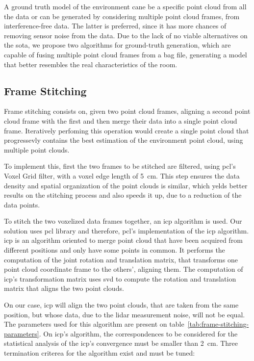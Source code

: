 A ground truth model of the environment cane be a specific point cloud from all the data or can be generated by considering multiple point cloud frames, from interference-free data. The latter is preferred, since it has more chances of removing sensor noise from the data. Due to the lack of no viable alternatives on the \acl{sota}, we propose two algorithms for ground-truth generation, which are capable of fusing multiple point cloud frames from a bag file, generating a model that better resembles the real characteristics of the room.


\subsection{Frame Stitching}
\label{subsec:lidar-interference:frame-stitching}
Frame stitching consists on, given two point cloud frames, aligning a second point cloud frame with the first and then merge their data into a single point cloud frame. Iteratively perfoming this operation would create a single point cloud that progressevly contains the best estimation of the environment point cloud, using multiple point clouds.

To implement this, first the two frames to be stitched are filtered, using \ac{pcl}'s Voxel Grid filter, with a voxel edge length of \SI{5}{\centi\meter}. This step ensures the data density and spatial organization of the point clouds is similar, which yelds better results on the stitching process and also speeds it up, due to a reduction of the data points.

To stitch the two voxelized data frames together, an \ac{icp} algorithm is used. Our solution uses \ac{pcl} library and therefore, \ac{pcl}'s implementation of the \ac{icp} algorithm. \ac{icp} is an algorithm oriented to merge point cloud that have been acquired from different positions and only have some points in common. It performs the computation of the joint rotation and translation matrix, that transforms one point cloud coordinate frame to the others', aligning them. The computation of \ac{icp}'s transformation matrix uses \ac{svd} to compute the rotation and translation matrix that aligns the two point clouds.

On our case, \ac{icp} will align the two point clouds, that are taken from the same position, but whose data, due to the \ac{lidar} measurement noise, will not be equal. The parameters used for this algorithm are present on table~\ref{tab:frame-stitching-parameters}. On \ac{icp}'s algorithm, the correspondences to be considered for the statistical analysis of the \ac{icp}'s convergence must be smaller than \SI{2}{\centi\meter}. Three termination criterea for the algorithm exist and must be tuned:

